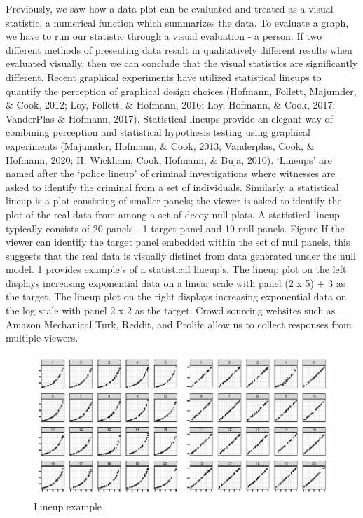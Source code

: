 \documentclass[print]{nuthesis}
\begin{document}
Previously, we saw how a data plot can be evaluated and treated as a visual statistic, a numerical function which summarizes the data.
To evaluate a graph, we have to run our statistic through a visual evaluation - a person.
If two different methods of presenting data result in qualitatively different results when evaluated visually, then we can conclude that the visual statistics are significantly different.
Recent graphical experiments have utilized statistical lineups to quantify the perception of graphical design choices
(Hofmann, Follett, Majumder, \& Cook, 2012; Loy, Follett, \& Hofmann, 2016; Loy, Hofmann, \& Cook, 2017; VanderPlas \& Hofmann, 2017).
Statistical lineups provide an elegant way of combining perception and statistical hypothesis testing using graphical experiments (Majumder, Hofmann, \& Cook, 2013; Vanderplas, Cook, \& Hofmann, 2020; H. Wickham, Cook, Hofmann, \& Buja, 2010).
`Lineups' are named after the `police lineup' of criminal investigations where witnesses are asked to identify the criminal from a set of individuals.
Similarly, a statistical lineup is a plot consisting of smaller panels; the viewer is asked to identify the plot of the real data from among a set of decoy null plots.
A statistical lineup typically consists of 20 panels - 1 target panel and 19 null panels. Figure
If the viewer can identify the target panel embedded within the set of null panels, this suggests that the real data is visually distinct from data generated under the null model.
\cref{fig:lineup-example} provides example's of a statistical lineup's. The lineup plot on the left displays increasing exponential data on a linear scale with panel (2 x 5) + 3 as the target.
The lineup plot on the right displays increasing exponential data on the log scale with panel 2 x 2 as the
target.
Crowd sourcing websites such as Amazon Mechanical Turk, Reddit, and Prolifc allow us to collect responses from multiple viewers.

\begin{figure}[tbp]

{\centering \includegraphics[width=\linewidth,]{thesis_files/figure-latex/lineup-example-1} 

}

\caption{Lineup example}\label{fig:lineup-example}
\end{figure}
\end{document}
